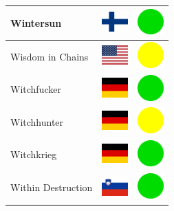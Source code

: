 \documentclass[12pt, a4paper, twoside]{report}
\begin{document}
\begin{center}
\begin{longtable}{|p{5cm}|p{2cm}|p{2cm}|}
 Wintersun                                                  & \includegraphics[width=1cm]{../4x3/fi} &   \includegraphics[width=1cm]{../likes/y} \\ \hline
 Wisdom in Chains                                           & \includegraphics[width=1cm]{../4x3/us} &   \includegraphics[width=1cm]{../likes/m} \\ \hline
 Witchfucker                                                & \includegraphics[width=1cm]{../4x3/de} &   \includegraphics[width=1cm]{../likes/y} \\ \hline
 Witchhunter                                                & \includegraphics[width=1cm]{../4x3/de} &   \includegraphics[width=1cm]{../likes/m} \\ \hline
 Witchkrieg                                                 & \includegraphics[width=1cm]{../4x3/de} &   \includegraphics[width=1cm]{../likes/y} \\ \hline
 Within Destruction                                         & \includegraphics[width=1cm]{../4x3/si} &   \includegraphics[width=1cm]{../likes/y} \\ \hline

\end{longtable}
\end{center}
\end{document}
